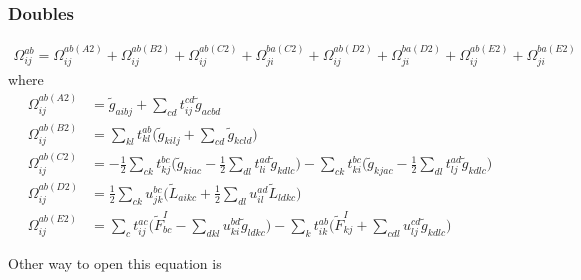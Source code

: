 \subsubsection{Doubles}
\hypertarget{sec:ccsd_res_doub}{}
\label{sec:ccsd_res_doub}

\begin{equation}
  \begin{split}
    \Omega_{ij}^{ab}=\Omega_{ij}^{ab(A2)}+\Omega_{ij}^{ab(B2)}+\Omega_{ij}^{ab(C2)}+\Omega_{ji}^{ba(C2)}+\Omega_{ij}^{ab(D2)}+\Omega_{ji}^{ba(D2)}+\Omega_{ij}^{ab(E2)}+\Omega_{ji}^{ba(E2)}
  \end{split}
\end{equation}
where
\begin{align}
  \Omega_{ij}^{ab(A2)}&={\tilde g}_{aibj}+\sum_{cd}t_{ij}^{cd}{\tilde g}_{acbd}\\
  \Omega_{ij}^{ab(B2)}&=\sum_{kl}t_{kl}^{ab}\bigg({\tilde g}_{kilj}+\sum_{cd}{\tilde g}_{kcld}\bigg)\\
  \Omega_{ij}^{ab(C2)}&=-\frac{1}{2}\sum_{ck}t_{kj}^{bc}\bigg({\tilde g}_{kiac}-\frac{1}{2}\sum_{dl}t_{li}^{ad}{\tilde g}_{kdlc}\bigg)-\sum_{ck}t_{ki}^{bc}\bigg({\tilde g}_{kjac}-\frac{1}{2}\sum_{dl}t_{lj}^{ad}{\tilde g}_{kdlc}\bigg)\\
  \Omega_{ij}^{ab(D2)}&=\frac{1}{2}\sum_{ck}u_{jk}^{bc}\bigg({\tilde L}_{aikc}+\frac{1}{2}\sum_{dl}u_{il}^{ad}{\tilde L}_{ldkc}\bigg)\\
  \Omega_{ij}^{ab(E2)}&=\sum_{c}t_{ij}^{ac}\bigg({\tilde F}_{bc}^{I}-\sum_{dkl}u_{ki}^{bd}{\tilde g}_{ldkc}\bigg)-\sum_{k}t_{ik}^{ab}\bigg({\tilde F}_{kj}^{I}+\sum_{cdl}u_{lj}^{cd}{\tilde g}_{kdlc}\bigg)
\end{align}


Other way to open this equation is

